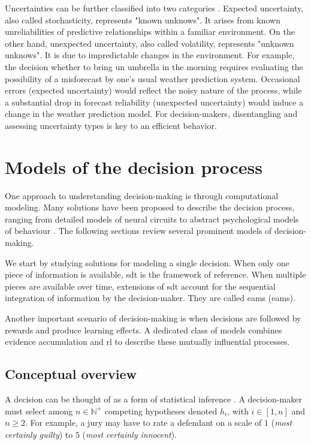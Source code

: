 Uncertainties can be further classified into two categories \cite{yuUncertaintyNeuromodulationAttention2005}. Expected uncertainty, also called stochasticity, represents "known unknows". It arises from known unreliabilities of predictive relationships within a familiar environment. On the other hand, unexpected uncertainty, also called volatility, represents "unknown unknows". It is due to impredictable changes in the environment. For example, the decision whether to bring un umbrella in the morning requires evaluating the possibility of a misforecast by one's usual weather prediction system. Occasional errors (expected uncertainty) would reflect the noisy nature of the process, while a substantial drop in forecast reliability (unexpected uncertainty) would induce a change in the weather prediction model. For decision-makers, disentangling and assessing uncertainty types is key to an efficient behavior. 

\section{Models of the decision process}

One approach to understanding decision-making is through computational modeling. Many solutions have been proposed to describe the decision process, ranging from detailed models of neural circuits to abstract psychological models of behaviour \cite{bogaczOptimalDecisionmakingTheories2007}. The following sections review several prominent models of decision-making.

We start by studying solutions for modeling a single decision. When only one piece of information is available, \acrfull{sdt} is the framework of reference. When multiple pieces are available over time, extensions of \acrshort{sdt} account for the sequential integration of information by the decision-maker. They are called \acrlong{eam}s (\acrshort{eam}s).

Another important scenario of decision-making is when decisions are followed by rewards and produce learning effects. A dedicated class of models combines evidence accumulation and \acrfull{rl} to describe these mutually influential processes.

\subsection{Conceptual overview}

A decision can be thought of as a form of statistical inference \cite{goldNeuralBasisDecision2007}. A decision-maker must select among $n \in \mathbb{N^{+}}$ competing hypotheses denoted $h_i$, with $i \in [1,n]$ and $n \ge 2$. For example, a jury may have to rate a defendant on a scale of $1$ (\textit{most certainly guilty}) to $5$ (\textit{most certainly innocent}).

